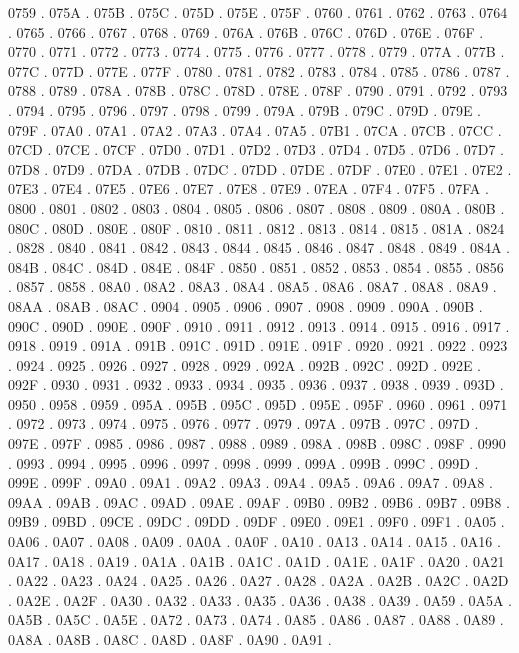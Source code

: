 0759 .
075A .
075B .
075C .
075D .
075E .
075F .
0760 .
0761 .
0762 .
0763 .
0764 .
0765 .
0766 .
0767 .
0768 .
0769 .
076A .
076B .
076C .
076D .
076E .
076F .
0770 .
0771 .
0772 .
0773 .
0774 .
0775 .
0776 .
0777 .
0778 .
0779 .
077A .
077B .
077C .
077D .
077E .
077F .
0780 .
0781 .
0782 .
0783 .
0784 .
0785 .
0786 .
0787 .
0788 .
0789 .
078A .
078B .
078C .
078D .
078E .
078F .
0790 .
0791 .
0792 .
0793 .
0794 .
0795 .
0796 .
0797 .
0798 .
0799 .
079A .
079B .
079C .
079D .
079E .
079F .
07A0 .
07A1 .
07A2 .
07A3 .
07A4 .
07A5 .
07B1 .
07CA .
07CB .
07CC .
07CD .
07CE .
07CF .
07D0 .
07D1 .
07D2 .
07D3 .
07D4 .
07D5 .
07D6 .
07D7 .
07D8 .
07D9 .
07DA .
07DB .
07DC .
07DD .
07DE .
07DF .
07E0 .
07E1 .
07E2 .
07E3 .
07E4 .
07E5 .
07E6 .
07E7 .
07E8 .
07E9 .
07EA .
07F4 .
07F5 .
07FA .
0800 .
0801 .
0802 .
0803 .
0804 .
0805 .
0806 .
0807 .
0808 .
0809 .
080A .
080B .
080C .
080D .
080E .
080F .
0810 .
0811 .
0812 .
0813 .
0814 .
0815 .
081A .
0824 .
0828 .
0840 .
0841 .
0842 .
0843 .
0844 .
0845 .
0846 .
0847 .
0848 .
0849 .
084A .
084B .
084C .
084D .
084E .
084F .
0850 .
0851 .
0852 .
0853 .
0854 .
0855 .
0856 .
0857 .
0858 .
08A0 .
08A2 .
08A3 .
08A4 .
08A5 .
08A6 .
08A7 .
08A8 .
08A9 .
08AA .
08AB .
08AC .
0904 .
0905 .
0906 .
0907 .
0908 .
0909 .
090A .
090B .
090C .
090D .
090E .
090F .
0910 .
0911 .
0912 .
0913 .
0914 .
0915 .
0916 .
0917 .
0918 .
0919 .
091A .
091B .
091C .
091D .
091E .
091F .
0920 .
0921 .
0922 .
0923 .
0924 .
0925 .
0926 .
0927 .
0928 .
0929 .
092A .
092B .
092C .
092D .
092E .
092F .
0930 .
0931 .
0932 .
0933 .
0934 .
0935 .
0936 .
0937 .
0938 .
0939 .
093D .
0950 .
0958 .
0959 .
095A .
095B .
095C .
095D .
095E .
095F .
0960 .
0961 .
0971 .
0972 .
0973 .
0974 .
0975 .
0976 .
0977 .
0979 .
097A .
097B .
097C .
097D .
097E .
097F .
0985 .
0986 .
0987 .
0988 .
0989 .
098A .
098B .
098C .
098F .
0990 .
0993 .
0994 .
0995 .
0996 .
0997 .
0998 .
0999 .
099A .
099B .
099C .
099D .
099E .
099F .
09A0 .
09A1 .
09A2 .
09A3 .
09A4 .
09A5 .
09A6 .
09A7 .
09A8 .
09AA .
09AB .
09AC .
09AD .
09AE .
09AF .
09B0 .
09B2 .
09B6 .
09B7 .
09B8 .
09B9 .
09BD .
09CE .
09DC .
09DD .
09DF .
09E0 .
09E1 .
09F0 .
09F1 .
0A05 .
0A06 .
0A07 .
0A08 .
0A09 .
0A0A .
0A0F .
0A10 .
0A13 .
0A14 .
0A15 .
0A16 .
0A17 .
0A18 .
0A19 .
0A1A .
0A1B .
0A1C .
0A1D .
0A1E .
0A1F .
0A20 .
0A21 .
0A22 .
0A23 .
0A24 .
0A25 .
0A26 .
0A27 .
0A28 .
0A2A .
0A2B .
0A2C .
0A2D .
0A2E .
0A2F .
0A30 .
0A32 .
0A33 .
0A35 .
0A36 .
0A38 .
0A39 .
0A59 .
0A5A .
0A5B .
0A5C .
0A5E .
0A72 .
0A73 .
0A74 .
0A85 .
0A86 .
0A87 .
0A88 .
0A89 .
0A8A .
0A8B .
0A8C .
0A8D .
0A8F .
0A90 .
0A91 .
